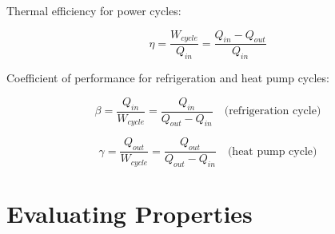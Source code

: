 \documentclass[paper=letter, fontsize=11pt]{scrartcl}
\numberwithin{equation}{section}        %
\numberwithin{figure}{section}          %
\numberwithin{table}{section}               %
\begin{document}
Thermal efficiency for power cycles:

\begin{equation}
\eta = \frac{W_{cycle}}{Q_{in}} = \frac{Q_{in}-Q_{out}}{Q_{in}}
\end{equation}

Coefficient of performance for refrigeration and heat pump cycles:

\begin{equation}
\beta = \frac{Q_{in}}{W_{cycle}} = \frac{Q_{in}}{Q_{out}-Q_{in}}\quad\text{(refrigeration cycle)}
\end{equation}

\begin{equation}
\gamma = \frac{Q_{out}}{W_{cycle}} = \frac{Q_{out}}{Q_{out}-Q_{in}}\quad\text{(heat pump cycle)}
\end{equation}


\section{Evaluating Properties}



\end{document}
